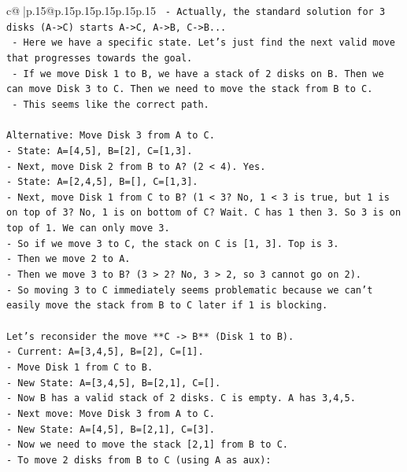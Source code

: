 \documentclass{article}
\begin{document}
{\begin{supertabular}{c@{$\;$}|p{.15\linewidth}@{}p{.15\linewidth}p{.15\linewidth}p{.15\linewidth}p{.15\linewidth}p{.15\linewidth}}
{{{\texttt{  {-} Actually, the standard solution for 3 disks (A{-}>C) starts A{-}>C, A{-}>B, C{-}>B...} \\
\texttt{  {-} Here we have a specific state. Let's just find the next valid move that progresses towards the goal.} \\
\texttt{  {-} If we move Disk 1 to B, we have a stack of 2 disks on B. Then we can move Disk 3 to C. Then we need to move the stack from B to C.} \\
\texttt{  {-} This seems like the correct path.} \\
\\ 
\texttt{Alternative: Move Disk 3 from A to C.} \\
\texttt{{-} State: A={[}4,5{]}, B={[}2{]}, C={[}1,3{]}.} \\
\texttt{{-} Next, move Disk 2 from B to A? (2 < 4). Yes.} \\
\texttt{{-} State: A={[}2,4,5{]}, B={[}{]}, C={[}1,3{]}.} \\
\texttt{{-} Next, move Disk 1 from C to B? (1 < 3? No, 1 < 3 is true, but 1 is on top of 3? No, 1 is on bottom of C? Wait. C has 1 then 3. So 3 is on top of 1. We can only move 3.} \\
\texttt{{-} So if we move 3 to C, the stack on C is {[}1, 3{]}. Top is 3.} \\
\texttt{{-} Then we move 2 to A.} \\
\texttt{{-} Then we move 3 to B? (3 > 2? No, 3 > 2, so 3 cannot go on 2).} \\
\texttt{{-} So moving 3 to C immediately seems problematic because we can't easily move the stack from B to C later if 1 is blocking.} \\
\\ 
\texttt{Let's reconsider the move **C {-}> B** (Disk 1 to B).} \\
\texttt{{-} Current: A={[}3,4,5{]}, B={[}2{]}, C={[}1{]}.} \\
\texttt{{-} Move Disk 1 from C to B.} \\
\texttt{{-} New State: A={[}3,4,5{]}, B={[}2,1{]}, C={[}{]}.} \\
\texttt{{-} Now B has a valid stack of 2 disks. C is empty. A has 3,4,5.} \\
\texttt{{-} Next move: Move Disk 3 from A to C.} \\
\texttt{{-} New State: A={[}4,5{]}, B={[}2,1{]}, C={[}3{]}.} \\
\texttt{{-} Now we need to move the stack {[}2,1{]} from B to C.} \\
\texttt{{-} To move 2 disks from B to C (using A as aux):} \\
}}}
\end{supertabular}}
\end{document}
